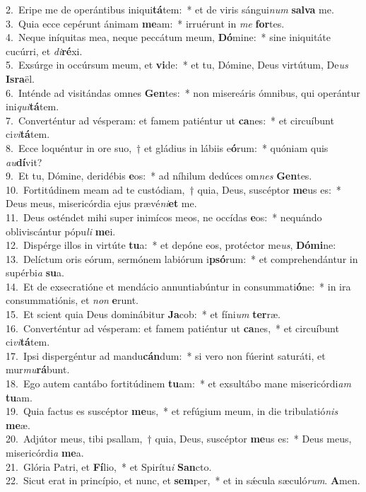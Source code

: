 {2.~}Eripe me de operántibus iniqui\textbf{tá}tem:~* et de viris sángui\textit{num} \textbf{sal}\textbf{va} me.\\
{3.~}Quia ecce cepérunt ánimam \textbf{me}am:~* irruérunt in \textit{me} \textbf{for}tes.\\
{4.~}Neque iníquitas mea, neque peccátum meum, \textbf{Dó}mine:~* sine iniquitáte cucúrri, et \textit{di}\textbf{ré}xi.\\
{5.~}Exsúrge in occúrsum meum, et \textbf{vi}de:~* et tu, Dómine, Deus virtútum, De\textit{us} \textbf{Is}\textbf{ra}ël.\\
{6.~}Inténde ad visitándas omnes \textbf{Gen}tes:~* non misereáris ómnibus, qui operántur ini\textit{qui}\textbf{tá}tem.\\
{7.~}Converténtur ad vésperam: et famem patiéntur ut \textbf{ca}nes:~* et circuíbunt ci\textit{vi}\textbf{tá}tem.\\
{8.~}Ecce loquéntur in ore suo,~† et gládius in lábiis e\textbf{ó}rum:~* quóniam quis \textit{au}\textbf{dí}vit?\\
{9.~}Et tu, Dómine, deridébis \textbf{e}os:~* ad níhilum dedúces om\textit{nes} \textbf{Gen}tes.\\
{10.~}Fortitúdinem meam ad te custódiam,~† quia, Deus, suscéptor \textbf{me}us es:~* Deus meus, misericórdia ejus prævé\textit{ni}\textbf{et} me.\\
{11.~}Deus osténdet mihi super inimícos meos, ne occídas \textbf{e}os:~* nequándo obliviscántur pópu\textit{li} \textbf{me}i.\\
{12.~}Dispérge illos in virtúte \textbf{tu}a:~* et depóne eos, protéctor me\textit{us}, \textbf{Dó}\textbf{mi}ne:\\
{13.~}Delíctum oris eórum, sermónem labiórum i\textbf{psó}rum:~* et comprehendántur in supérbi\textit{a} \textbf{su}a.\\
{14.~}Et de exsecratióne et mendácio annuntiabúntur in consummati\textbf{ó}ne:~* in ira consummatiónis, et \textit{non} \textbf{e}runt.\\
{15.~}Et scient quia Deus dominábitur \textbf{Ja}cob:~* et fíni\textit{um} \textbf{ter}ræ.\\
{16.~}Converténtur ad vésperam: et famem patiéntur ut \textbf{ca}nes,~* et circuíbunt ci\textit{vi}\textbf{tá}tem.\\
{17.~}Ipsi dispergéntur ad mandu\textbf{cán}dum:~* si vero non fúerint saturáti, et mur\textit{mu}\textbf{rá}bunt.\\
{18.~}Ego autem cantábo fortitúdinem \textbf{tu}am:~* et exsultábo mane misericórdi\textit{am} \textbf{tu}am.\\
{19.~}Quia factus es suscéptor \textbf{me}us,~* et refúgium meum, in die tribulatió\textit{nis} \textbf{me}æ.\\
{20.~}Adjútor meus, tibi psallam,~† quia, Deus, suscéptor \textbf{me}us es:~* Deus meus, misericórdi\textit{a} \textbf{me}a.\\
{21.~}Glória Patri, et \textbf{Fí}lio,~* et Spirítu\textit{i} \textbf{San}cto.\\
{22.~}Sicut erat in princípio, et nunc, et \textbf{sem}per,~* et in sǽcula sæculó\textit{rum}. \textbf{A}men.\\
